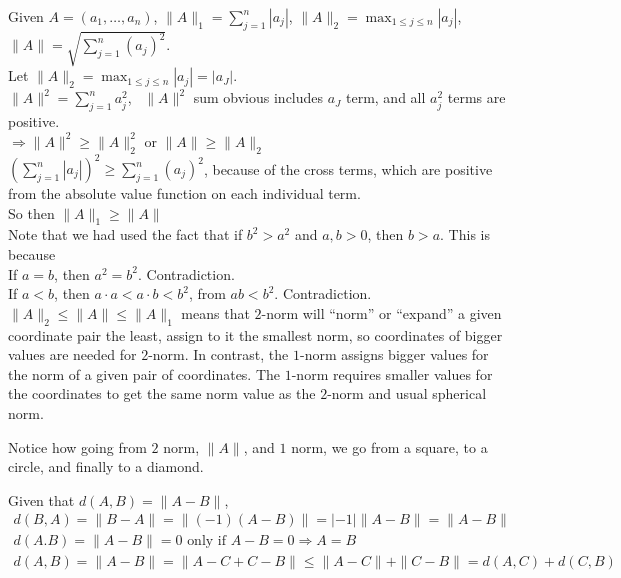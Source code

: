 \documentclass[twoside]{amsart}
\theoremstyle{plain}
\theoremstyle{definition}
\newcommand{\exercisehead}[1]
  {\smallskip
   \noindent{\small\bf Exercise #1.}}
\begin{document}
\exercisehead{19} Given $A = (a_1, \dots, a_n)$, $\|A \|_1 = \sum_{j=1}^n |a_j|$, \quad $\| A \|_2 = \max_{1 \leq j \leq n} |a_j|$, \quad $\| A \| = \sqrt{ \sum_{j=1}^n (a_j)^2 }$.  \\

Let $ \| A \|_2 = \max_{1 \leq j \leq n} |a_j | = |a_J|$.  \medskip \\
$\| A \|^2 = \sum_{j=1}^n a_j^2 $, \quad \, $\|A \|^2$ sum obvious includes $a_J$ term, and all $a_j^2$ terms are positive.  \medskip \\
$\Longrightarrow \|A \|^2 \geq \| A \|_2^2 $ or $\| A \| \geq \| A\|_2$  \\

$\left( \sum_{j=1}^n |a_j| \right)^2 \geq \sum_{j=1}^n (a_j)^2 $, because of the cross terms, which are positive from the absolute value function on each individual term.   \medskip \\
So then $\| A\|_1 \geq \|A \|$ \\

Note that we had used the fact that if $b^2 > a^2$ and $a,b>0$, then $b>a$.  This is because \\
If $a=b$, then $a^2 = b^2$.  Contradiction. \\
If $a <b$, then $a\cdot a < a\cdot b < b^2 $, from $ab < b^2$.  Contradiction.   \\

$\| A \|_2 \leq \| A \| \leq \| A \|_1$ means that $2$-norm will ``norm'' or ``expand'' a given coordinate pair the least, assign to it the smallest norm, so coordinates of bigger values are needed for $2$-norm.  In contrast, the $1$-norm assigns bigger values for the norm of a given pair of coordinates.  The $1$-norm requires smaller values for the coordinates to get the same norm value as the $2$-norm and usual spherical norm.  

Notice how going from $2$ norm, $\| A\|$, and $1$ norm, we go from a square, to a circle, and finally to a diamond.  

\exercisehead{20} Given that $d(A,B) = \| A - B \|$,
\[
\begin{gathered}
  d(B,A) = \| B - A \| = \| (-1) (A-B) \| = |-1| \| A - B \| = \|A - B \| \\
  d(A.B) = \| A - B \| = 0 \text{ only if } A - B = 0 \Longrightarrow A = B \\
  d(A,B) = \| A - B \| = \| A - C + C  - B \| \leq \|A - C \| + \|C - B \|  = d(A,C) + d(C,B) 
\end{gathered}
\]
\end{document}
